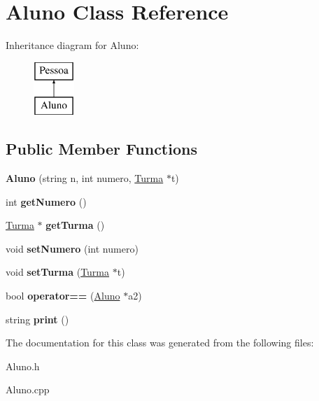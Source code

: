 \hypertarget{class_aluno}{\section{Aluno Class Reference}
\label{class_aluno}
}
Inheritance diagram for Aluno\-:\begin{figure}[H]
\begin{center}
\leavevmode
\includegraphics[height=2.000000cm]{class_aluno}
\end{center}
\end{figure}
\subsection*{Public Member Functions}
\begin{DoxyCompactItemize}
\item 
\hypertarget{class_aluno_afa2d1a87c5d62a63381065ee0cf2ea7f}{{\bfseries Aluno} (string n, int numero, \hyperlink{class_turma}{Turma} $\ast$t)}\label{class_aluno_afa2d1a87c5d62a63381065ee0cf2ea7f}

\item 
\hypertarget{class_aluno_a258e8f5c3dbc8b19efadaf20ba48874f}{int {\bfseries get\-Numero} ()}\label{class_aluno_a258e8f5c3dbc8b19efadaf20ba48874f}

\item 
\hypertarget{class_aluno_a1f3d823c2589d39d930738689707ba3d}{\hyperlink{class_turma}{Turma} $\ast$ {\bfseries get\-Turma} ()}\label{class_aluno_a1f3d823c2589d39d930738689707ba3d}

\item 
\hypertarget{class_aluno_a36ad83483a9e0c247d7092a95607758c}{void {\bfseries set\-Numero} (int numero)}\label{class_aluno_a36ad83483a9e0c247d7092a95607758c}

\item 
\hypertarget{class_aluno_a5403cd3d2d1a219f9aa49bc53825d4fc}{void {\bfseries set\-Turma} (\hyperlink{class_turma}{Turma} $\ast$t)}\label{class_aluno_a5403cd3d2d1a219f9aa49bc53825d4fc}

\item 
\hypertarget{class_aluno_a70c5a814dcd56edc12bbe2c00aa3a7a6}{bool {\bfseries operator==} (\hyperlink{class_aluno}{Aluno} $\ast$a2)}\label{class_aluno_a70c5a814dcd56edc12bbe2c00aa3a7a6}

\item 
\hypertarget{class_aluno_ac5c1bdeaea70f418dd7aa1b0c73160aa}{string {\bfseries print} ()}\label{class_aluno_ac5c1bdeaea70f418dd7aa1b0c73160aa}

\end{DoxyCompactItemize}


The documentation for this class was generated from the following files\-:\begin{DoxyCompactItemize}
\item 
Aluno.\-h\item 
Aluno.\-cpp\end{DoxyCompactItemize}

